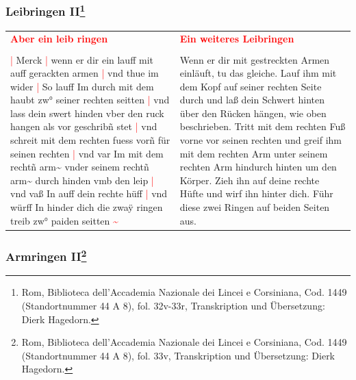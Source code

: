 \subsubsection[Leibringen II]{
    Leibringen II\footnote{
        \hspace*{0.5ex}Rom, Biblioteca dell'Accademia Nazionale dei Lincei e Corsiniana,
        Cod. 1449 (Standortnummer 44 A 8), fol. 32v-33r, Transkription und Übersetzung: Dierk Hagedorn.}}

\begin{longtable}{p{6.25cm}p{6.25cm}}
    \textbf{\textcolor{red}{
        Aber ein leib ringen}}
    &
    \textbf{\textcolor{red}{
        Ein weiteres Leibringen}}
    \\
    \\
    \textcolor{red}{|} Merck
    \textcolor{red}{|} wenn er dir ein lauff mit auff gerackten armen
    \textcolor{red}{|} vnd thue im wider
    \textcolor{red}{|} So lauff Im durch mit dem haubt zw° seiner rechten seitten
    \textcolor{red}{|} vnd lass dein swert hinden vber den ruck hangen als vor geschribñ stet
    \textcolor{red}{|} vnd schreit mit dem rechten fuess vorñ für seinen rechten
    \textcolor{red}{|} vnd var Im mit dem rechtñ arm\textasciitilde{} vnder seinem rechtñ arm\textasciitilde{} durch hinden vmb den leip
    \textcolor{red}{|} vnd vaß In auff dein rechte hüff
    \textcolor{red}{|} vnd würff In hinder dich die zwaÿ ringen treib zw° paiden seitten \textcolor{red}{\textasciitilde{}}
    &
    Wenn er dir mit gestreckten Armen einläuft, tu das gleiche.
    Lauf ihm mit dem Kopf auf seiner rechten Seite durch und laß dein Schwert hinten über den Rücken hängen, wie oben beschrieben.
    Tritt mit dem rechten Fuß vorne vor seinen rechten und greif ihm mit dem rechten Arm unter seinem rechten Arm hindurch hinten um den Körper.
    Zieh ihn auf deine rechte Hüfte und wirf ihn hinter dich.
    Führ diese zwei Ringen auf beiden Seiten aus.
\end{longtable}

\newpage

\begin{center}
\end{center}

\newpage

\subsubsection[Armringen II]{
    Armringen II\footnote{
        \hspace*{0.5ex}Rom, Biblioteca dell'Accademia Nazionale dei Lincei e Corsiniana,
        Cod. 1449 (Standortnummer 44 A 8), fol. 33v, Transkription und Übersetzung: Dierk Hagedorn.}}

